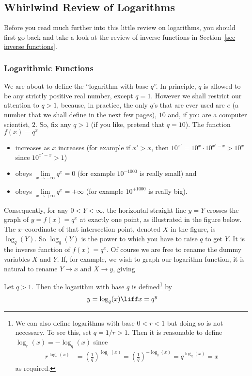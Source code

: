 \subsection*{Whirlwind Review of Logarithms}
Before you read much further into this little review on logarithms,
you should first go back and take a look at the review of inverse
functions in Section~\ref{sec inverse  functions}.
\subsubsection*{Logarithmic Functions}
We are about to define the ``logarithm with base $q$''.
In principle, $q$ is allowed to be any strictly positive real
number, except $q=1$. However we shall restrict our attention
to $q>1$, because, in practice, the only $q$'s that are ever
used are $e$ (a number that we shall define in the next few pages),
$10$ and, if you are a computer scientist, $2$.
So, fix any $q>1$ (if you like, pretend that $q=10$). The function
$f(x)=q^x$
\begin{itemize}
\item increases as $x$ increases (for example if $x'>x$, then
                          $10^{x'} = 10^x \cdot 10^{x'-x} >10^x$ since
                          $10^{x'-x}>1$)
\item obeys $\lim\limits_{x\rightarrow-\infty} q^x=0$ (for
                        example $10^{-1000}$ is really small) and
\item obeys $\lim\limits_{x\rightarrow+\infty} q^x=+\infty$ (for
                        example $10^{+1000}$ is really big).
\end{itemize}
Consequently, for any $0<Y<\infty$, the horizontal straight line
$y=Y$ crosses the graph of $y=f(x)=q^x$ at exactly one point,
as illustrated in the figure below.
The $x$--coordinate of that
intersection point, denoted $X$ in the figure, is $\log_q(Y)$.
So $\log_q(Y)$ is the power to which you have to raise $q$ to get $Y$.
It is the inverse function of $f(x)=q^x$. Of course we are free
to rename the dummy variables $X$ and $Y$. If, for example,
we wish to graph our logarithm function, it is natural to rename
$Y\rightarrow x$ and $X\rightarrow y$, giving
\begin{defn}\label{def_2_7_1}
Let $q>1$. Then the logarithm with base $q$ is defined\footnote{
We can also define logarithms with base $0<r<1$ but doing so is not necessary.
To see this, set $q=1/r>1$. Then it is reasonable to define $\log_r(x) = -
\log_q(x)$ since
\begin{align*}
  r^{\log_r(x)}
  &= \left(\frac{1}{q}\right)^{\log_r(x)}
  = \left(\frac{1}{q}\right)^{-\log_q(x)}
  = q^{\log_q(x)} = x
\end{align*}
as required.
} by
 \begin{align*}
  y=\log_q(x) & \liff x=q^y
\end{align*}
\end{defn}
